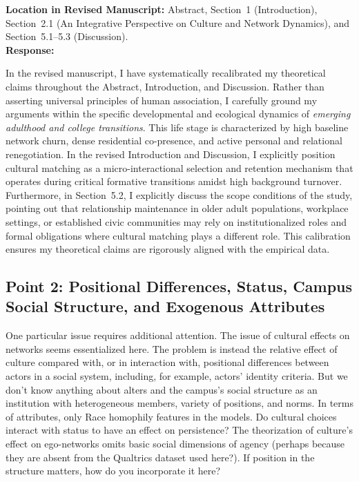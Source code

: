\documentclass[11pt]{article}
\begin{document}
\noindent\textbf{Location in Revised Manuscript:} Abstract, Section~1 (Introduction), Section~2.1 (An Integrative Perspective on Culture and Network Dynamics), and Section~5.1--5.3 (Discussion).\\[4pt]
\textbf{Response:} 

In the revised manuscript, I have systematically recalibrated my theoretical claims throughout the Abstract, Introduction, and Discussion. Rather than asserting universal principles of human association, I carefully ground my arguments within the specific developmental and ecological dynamics of \textit{emerging adulthood and college transitions}. This life stage is characterized by high baseline network churn, dense residential co-presence, and active personal and relational renegotiation. In the revised Introduction and Discussion, I explicitly position cultural matching as a micro-interactional selection and retention mechanism that operates during critical formative transitions amidst high background turnover. Furthermore, in Section~5.2, I explicitly discuss the scope conditions of the study, pointing out that relationship maintenance in older adult populations, workplace settings, or established civic communities may rely on institutionalized roles and formal obligations where cultural matching plays a different role. This calibration ensures my theoretical claims are rigorously aligned with the empirical data.

\subsection*{Point 2: Positional Differences, Status, Campus Social Structure, and Exogenous Attributes}

\begin{reviewercomment}
One particular issue requires additional attention. The issue of cultural effects on networks seems essentialized here. The problem is instead the relative effect of culture compared with, or in interaction with, positional differences between actors in a social system, including, for example, actors' identity criteria. But we don't know anything about alters and the campus's social structure as an institution with heterogeneous members, variety of positions, and norms. In terms of attributes, only Race homophily features in the models. Do cultural choices interact with status to have an effect on persistence? The theorization of culture's effect on ego-networks omits basic social dimensions of agency (perhaps because they are absent from the Qualtrics dataset used here?). If position in the structure matters, how do you incorporate it here?
\end{reviewercomment}
\end{document}
